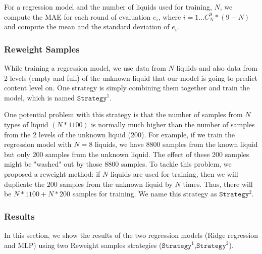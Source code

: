 \documentclass{article} %
\begin{document}
For a regression model and the number of liquids used for training, $N$, we compute the MAE for each round of evaluation $e_i$, where $i= 1\dots C_N^9 * (9-N)$ and compute the mean and the standard deviation of $e_i$.

\subsubsection{Reweight Samples}
While training a regression model, we use data from $N$ liquids and also data from 2 levels (empty and full) of the unknown liquid that our model is going to predict content level on. One strategy is simply combining them together and train the model, which is named $\mathtt{Strategy}^1$. 

One potential problem with this strategy is that the number of samples from $N$ types of liquid $(N * 1100)$ is normally much higher than the number of samples from the 2 levels of the unknown liquid (200). For example, if we train the regression model with $N = 8$ liquids, we have 8800 samples from the known liquid but only 200 samples from the unknown liquid. The effect of these 200 samples might be "washed" out by those 8800 samples. To tackle this problem, we proposed a reweight method: if $N$ liquids are used for training, then we will duplicate the 200 samples from the unknown liquid by $N$ times. Thus, there will be $N * 1100 + N * 200$ samples for training. We name this strategy as $\mathtt{Strategy}^2$.

\subsubsection{Results}
In this section, we show the results of the two regression models (Ridge regression and MLP) using two Reweight samples strategies ($\mathtt{Strategy}^1$,$\mathtt{Strategy}^2$).
\end{document}
